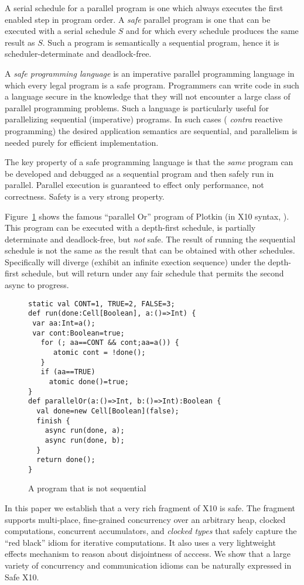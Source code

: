 A serial schedule for a parallel program is one which always executes
the first enabled step in program order. A {\em safe} parallel program
is one that can be executed with a serial schedule $S$ and for which
every schedule produces the same result as $S$.  Such a program is
semantically a sequential program, hence it is scheduler-determinate
and deadlock-free.

A {\em safe programming language} is an imperative parallel
programming language in which every legal program is a safe
program. Programmers can write code in such a language secure in the
knowledge that they will not encounter a large class of parallel
programming problems. Such a language is particularly useful for
parallelizing sequential (imperative) programs. In such cases ({\em
  contra} reactive programming) the desired application semantics are
sequential, and parallelism is needed purely for efficient
implementation.

The key property of a safe programming language is that the {\em same}
program can be developed and debugged as a sequential program and then
safely run in parallel. Parallel execution is guaranteed to effect
only performance, not correctness. Safety is a very strong property.

Figure~\ref{fig:1} shows  the famous ``parallel Or'' program of Plotkin 
 (in X10 syntax, \cite{x10}). This program can be executed with a
depth-first schedule, is partially determinate and deadlock-free, but {\em not}
safe. The result of running the sequential schedule is not the same as
the result that can be obtained with other schedules. Specifically
 will diverge (exhibit an
infinite exection sequence) under the depth-first schedule, but will
return  under any fair schedule that permits the second
async to progress.

\begin{figure}
  \begin{lstlisting}
static val CONT=1, TRUE=2, FALSE=3;
def run(done:Cell[Boolean], a:()=>Int) {
 var aa:Int=a();
 var cont:Boolean=true;         
   for (; aa==CONT && cont;aa=a()) {
      atomic cont = !done();  
   }
   if (aa==TRUE)
     atomic done()=true;
}
def parallelOr(a:()=>Int, b:()=>Int):Boolean {
  val done=new Cell[Boolean](false);
  finish {
    async run(done, a);
    async run(done, b);
  }
  return done();
}
  \end{lstlisting}
  \caption{A program that is not sequential}\label{fig:1}
\end{figure}
In this paper we establish that a very rich fragment of X10 is safe.
The fragment supports multi-place, fine-grained concurrency
over an arbitrary heap, clocked computations, concurrent accumulators,
and {\em clocked types} that safely capture the ``red black'' idiom
for iterative computations. It also uses a very lightweight effects
mechanism to reason about disjointness of acccess. We show that a
large variety of concurrency and communication idioms can be naturally
expressed in Safe X10.

